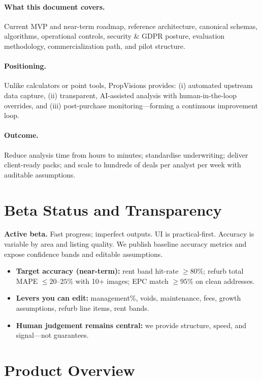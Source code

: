 \documentclass[12pt,a4paper]{article}
\begin{document}
\paragraph{What this document covers.} Current MVP and near-term roadmap, reference architecture, canonical schemas, algorithms, operational controls, security \& GDPR posture, evaluation methodology, commercialization path, and pilot structure.

\paragraph{Positioning.} Unlike calculators or point tools, PropVisions provides: (i) automated upstream data capture, (ii) transparent, AI-assisted analysis with human-in-the-loop overrides, and (iii) post-purchase monitoring—forming a continuous improvement loop.

\paragraph{Outcome.} Reduce analysis time from hours to minutes; standardise underwriting; deliver client-ready packs; and scale to hundreds of deals per analyst per week with auditable assumptions.

\section{Beta Status and Transparency}
\textbf{Active beta.} Fast progress; imperfect outputs. UI is practical-first. Accuracy is variable by area and listing quality. We publish baseline accuracy metrics and expose confidence bands and editable assumptions.

\begin{itemize}[leftmargin=1.5em]
  \item \textbf{Target accuracy (near-term):} rent band hit-rate $\geq 80\%$; refurb total MAPE $\leq 20$--$25\%$ with 10+ images; EPC match $\geq 95\%$ on clean addresses.
  \item \textbf{Levers you can edit:} management\%, voids, maintenance, fees, growth assumptions, refurb line items, rent bands.
  \item \textbf{Human judgement remains central:} we provide structure, speed, and signal—not guarantees.
\end{itemize}

\section{Product Overview}
\end{document}
